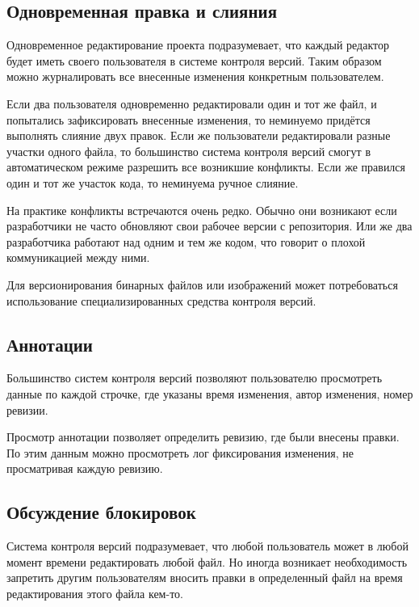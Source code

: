 
\subsection{ Одновременная правка и слияния } \label{sect3_2_6}

Одновременное редактирование проекта подразумевает, что каждый редактор будет иметь своего пользователя в системе контроля версий. Таким образом можно журналировать все внесенные изменения конкретным пользователем.

Если два пользователя одновременно редактировали один и тот же файл, и попытались зафиксировать внесенные изменения, то неминуемо придётся выполнять слияние двух правок. Если же пользователи редактировали разные участки одного файла, то большинство система контроля версий смогут в автоматическом режиме разрешить все возникшие конфликты. Если же правился один и тот же участок кода, то неминуема ручное слияние.

На практике конфликты встречаются очень редко. Обычно они возникают если разработчики не часто обновляют свои рабочее версии с репозитория. Или же два разработчика работают над одним и тем же кодом, что говорит о плохой коммуникацией между ними.

Для версионирования бинарных файлов или изображений может потребоваться использование специализированных средства контроля версий.

\subsection{ Аннотации } \label{sect3_2_7}

Большинство систем контроля версий позволяют пользователю просмотреть данные по каждой строчке, где указаны время изменения, автор изменения, номер ревизии.


Просмотр аннотации позволяет определить ревизию, где были внесены правки. По этим данным можно просмотреть лог фиксирования изменения, не просматривая каждую ревизию.

\subsection{ Обсуждение блокировок } \label{sect3_2_8}

Система контроля версий подразумевает, что любой пользователь может в любой момент времени редактировать любой файл. Но иногда возникает необходимость запретить другим пользователям вносить правки в определенный файл на время редактирования этого файла кем-то.

